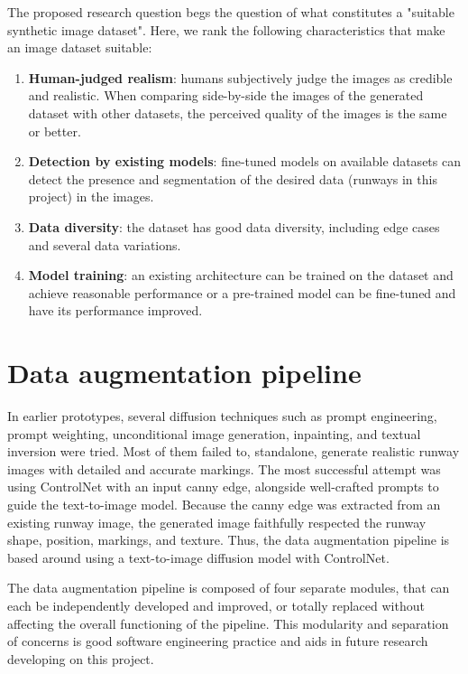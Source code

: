 The proposed research question begs the question of what constitutes a "suitable synthetic image dataset". Here, we rank the following characteristics that make an image dataset suitable:

\label{sec:suitable-dataset}
\begin{enumerate}
    \item \textbf{Human-judged realism}: humans subjectively judge the images as credible and realistic. When comparing side-by-side the images of the generated dataset with other datasets, the perceived quality of the images is the same or better.
    \item \textbf{Detection by existing models}: fine-tuned models on available datasets can detect the presence and segmentation of the desired data (runways in this project) in the images.
    \item \textbf{Data diversity}: the dataset has good data diversity, including edge cases and several data variations.
    \item \textbf{Model training}: an existing architecture can be trained on the dataset and achieve reasonable performance or a pre-trained model can be fine-tuned and have its performance improved.
\end{enumerate}

\section{Data augmentation pipeline}

In earlier prototypes, several diffusion techniques such as prompt engineering, prompt weighting, unconditional image generation, inpainting, and textual inversion were tried. Most of them failed to, standalone, generate realistic runway images with detailed and accurate markings. The most successful attempt was using ControlNet with an input canny edge, alongside well-crafted prompts to guide the text-to-image model. Because the canny edge was extracted from an existing runway image, the generated image faithfully respected the runway shape, position, markings, and texture. Thus, the data augmentation pipeline is based around using a text-to-image diffusion model with ControlNet.

The data augmentation pipeline is composed of four separate modules, that can each be independently developed and improved, or totally replaced without affecting the overall functioning of the pipeline. This modularity and separation of concerns is good software engineering practice and aids in future research developing on this project.

